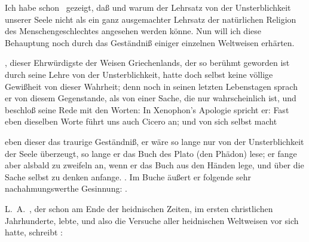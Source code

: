 \begin{aufza}
\item Ich habe schon \ gezeigt, daß und warum der Lehrsatz von der Unsterblichkeit unserer Seele nicht als ein ganz ausgemachter Lehrsatz der natürlichen Religion des Menschengeschlechtes angesehen werden könne. Nun will ich diese Behauptung noch durch das Geständniß einiger einzelnen Weltweisen erhärten.
\begin{aufzb}
\item {}, dieser Ehrwürdigste der Weisen Griechenlands, der so berühmt geworden ist durch seine Lehre von der Unsterblichkeit, hatte doch selbst keine völlige Gewißheit von dieser Wahrheit; denn noch in seinen letzten Lebenstagen sprach er von diesem Gegenstande, als von einer Sache, die nur wahrscheinlich ist, und beschloß seine Rede mit den Worten:  In Xenophon's Apologie spricht er:  Fast eben dieselben Worte führt uns auch Cicero  an; und von sich selbst macht
\item eben dieser  das traurige Geständniß, er wäre so lange nur von der Unsterblichkeit der Seele überzeugt, so lange er das Buch des Plato (den Phädon) lese; er fange aber alsbald zu zweifeln an, wenn er das Buch aus den Händen lege, und über die Sache selbst zu denken anfange. . Im Buche  äußert er folgende sehr nachahmungswerthe Gesinnung: .
\item L.~A.~, der schon am Ende der heidnischen Zeiten, im ersten christlichen Jahrhunderte, lebte, und also die Versuche aller heidnischen Weltweisen vor sich hatte, schreibt : \RWuebers{%
}
\end{aufzb}
\end{aufza}
